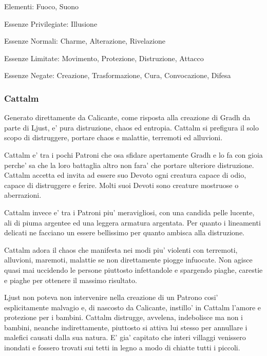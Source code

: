 \documentclass[a4paper,11pt,twoside,openany]{book}
\begin{document}
{\bigskip

Elementi: Fuoco, Suono

\bigskip

Essenze Privilegiate: Illusione

Essenze Normali: Charme, Alterazione, Rivelazione

Essenze Limitate: Movimento, Protezione, Distruzione, Attacco

Essenze Negate: Creazione, Trasformazione, Cura, Convocazione, Difesa

\subsubsection{Cattalm}

\label{cattalm}

Generato direttamente da Calicante, come risposta alla creazione di Gradh da parte di Ljust, e' pura distruzione, chaos ed entropia. Cattalm si prefigura il solo scopo di distruggere, portare chaos e malattie, terremoti ed alluvioni.

Cattalm e' tra i pochi Patroni che osa sfidare apertamente Gradh e lo fa con gioia perche' sa che la loro battaglia altro non fara' che portare ulteriore distruzione. Cattalm accetta ed invita ad essere suo Devoto ogni creatura capace di odio, capace di distruggere e ferire. Molti suoi Devoti sono creature mostruose o aberrazioni.

Cattalm invece e' tra i Patroni piu' meravigliosi, con una candida pelle lucente, ali di piuma argentee ed una leggera armatura argentata. Per quanto i lineamenti delicati ne facciano un essere bellissimo per quanto ambisca alla distruzione.

Cattalm adora il chaos che manifesta nei modi piu' violenti con terremoti, alluvioni, maremoti, malattie se non direttamente piogge infuocate. Non agisce quasi mai uccidendo le persone piuttosto infettandole e spargendo piaghe, carestie e piaghe per ottenere il massimo risultato.

Ljust non poteva non intervenire nella creazione di un Patrono cosi' esplicitamente malvagio e, di nascosto da Calicante, instillo' in Cattalm l'amore e protezione per i bambini. Cattalm distrugge, avvelena, indebolisce ma non i bambini, neanche indirettamente, piuttosto si attiva lui stesso per annullare i malefici causati dalla sua natura.
E' gia' capitato che interi villaggi venissero inondati e fossero trovati sui tetti in legno a modo di chiatte tutti i piccoli.

}
\end{document}
